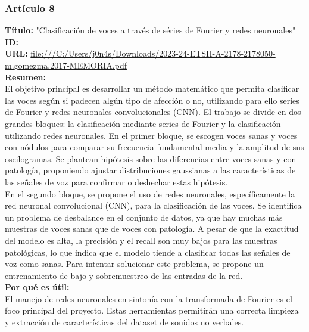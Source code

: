 \subsubsection*{Artículo 8}
    \textbf{Título:}
    "Clasificación de voces a través de séries de Fourier y redes neuronales"
    \\
    \textbf{ID: \cite{gomez2023clasificacion}}
    \\
    \textbf{URL:}
    \url{file:///C:/Users/j0n4s/Downloads/2023-24-ETSII-A-2178-2178050-m.gomezma.2017-MEMORIA.pdf}
    \\
    \textbf{Resumen:\\}
    El objetivo principal es desarrollar un método matemático que permita clasificar las voces según si padecen algún tipo de afección o no, utilizando para ello series de Fourier y redes neuronales convolucionales (CNN).
    El trabajo se divide en dos grandes bloques: la clasificación mediante series de Fourier y la clasificación utilizando redes neuronales. En el primer bloque, se escogen voces sanas y voces con nódulos para comparar su frecuencia fundamental media y la amplitud de sus oscilogramas. Se plantean hipótesis sobre las diferencias entre voces sanas y con patología, proponiendo ajustar distribuciones gaussianas a las características de las señales de voz para confirmar o deshechar estas hipótesis.
    \\En el segundo bloque, se propone el uso de redes neuronales, específicamente la red neuronal convolucional (CNN), para la clasificación de las voces. Se identifica un problema de desbalance en el conjunto de datos, ya que hay muchas más muestras de voces sanas que de voces con patología. A pesar de que la exactitud del modelo es alta, la precisión y el recall son muy bajos para las muestras patológicas, lo que indica que el modelo tiende a clasificar todas las señales de voz como sanas. Para intentar solucionar este problema, se propone un entrenamiento de bajo y sobremuestreo de las entradas de la red.
    \\
    \textbf{Por qué es útil:\\}
    El manejo de redes neuronales en sintonía con la transformada de Fourier es el foco principal del proyecto. Estas herramientas permitirán una correcta limpieza y extracción de características del dataset de sonidos no verbales.
\newpage
